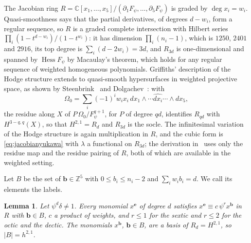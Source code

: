 \documentclass[11pt]{amsart}
\newtheorem{lemma}[theorem]{Lemma}
\theoremstyle{definition}
\theoremstyle{remark}
\newcommand{\Z}{\mathbb{Z}}
\newcommand{\C}{\mathbb{C}}
\newcommand{\Hess}{\operatorname{Hess}}
\newcommand{\bb}{\mathbf{b}}
\newcommand{\ee}{\mathbf{e}}
\begin{document}
The Jacobian ring $R=\C[x_1,\dots,x_5]/(\partial_1F_\psi,\dots,
\partial_5F_\psi)$ is graded by $\deg x_i=w_i$. Quasi-smoothness says that
the partial derivatives, of degrees $d-w_i$, form a regular sequence, so
$R$ is a graded complete intersection with Hilbert series
$\prod_i(1-t^{d-w_i})/(1-t^{w_i})$: it has dimension $\prod_i(n_i-1)$, which
is $1250$, $2401$ and $2916$, its top degree is $\sum_i(d-2w_i)=3d$, and
$R_{3d}$ is one-dimensional and spanned by $\Hess F_\psi$ by Macaulay's
theorem, which holds for any regular sequence of weighted homogeneous
polynomials. Griffiths' description of the Hodge structure extends to
quasi-smooth hypersurfaces in weighted projective space, as shown by
Steenbrink~\cite{Ste77} and Dolgachev~\cite{Dol82}: with
\[
\Omega_0=\sum_i(-1)^iw_ix_i\,dx_1\wedge\cdots\widehat{dx_i}\cdots\wedge dx_5,
\]
the residue along $X$ of $P\,\Omega_0/F_\psi^{q+1}$, for $P$ of degree
$qd$, identifies $R_{qd}$ with $H^{3-q,q}(X)$, so that $H^{2,1}=R_d$ and
$R_{3d}$ is the socle. The
infinitesimal variation of the Hodge structure is again multiplication in
$R$, and the cubic form is \eqref{eq:jacobianyukawa} with $\lambda$ a
functional on $R_{3d}$; the derivation in~\cite{CG80} uses only the residue
map and the residue pairing of $R$, both of which are available in the
weighted setting.

Let $B$ be the set of $\bb\in\Z^5$ with $0\le b_i\le n_i-2$ and
$\sum_iw_ib_i=d$. We call its elements the labels.

\begin{lemma}\label{lem:wlabels}
Let $\psi^d\delta\ne1$. Every monomial $x^{\ee}$ of degree $d$ satisfies
$x^{\ee}\equiv c\,\psi^r x^{\bb}$ in $R$ with $\bb\in B$, $c$ a product of
weights, and $r\le1$ for the sextic and $r\le2$ for the octic and the
dectic. The monomials $x^{\bb}$, $\bb\in B$, are a basis of $R_d=H^{2,1}$,
so $|B|=h^{2,1}$.
\end{lemma}
\end{document}
